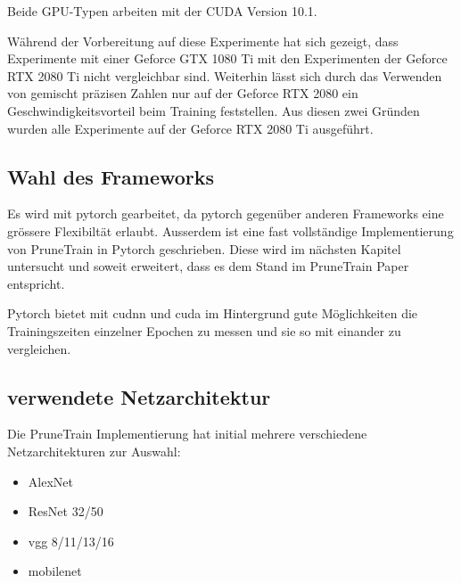 Beide GPU-Typen arbeiten mit der CUDA Version 10.1. 

Während der Vorbereitung auf diese Experimente hat sich gezeigt, dass Experimente mit einer Geforce GTX 1080 Ti mit den Experimenten der Geforce RTX 2080 Ti nicht vergleichbar sind. Weiterhin lässt sich durch das Verwenden von gemischt präzisen Zahlen nur auf der Geforce RTX 2080 ein Geschwindigkeitsvorteil beim Training feststellen. Aus diesen zwei Gründen wurden alle Experimente auf der Geforce RTX 2080 Ti ausgeführt.  


\subsection{Wahl des Frameworks}

Es wird mit pytorch gearbeitet, da pytorch gegenüber anderen Frameworks eine grössere Flexibiltät erlaubt. Ausserdem ist eine fast vollständige Implementierung von PruneTrain in Pytorch geschrieben. Diese wird im nächsten Kapitel untersucht und soweit erweitert, dass es dem Stand im PruneTrain Paper entspricht.

Pytorch bietet mit cudnn und cuda im Hintergrund gute Möglichkeiten die Trainingszeiten einzelner Epochen zu messen und sie so mit einander zu vergleichen.


\subsection{verwendete Netzarchitektur}\label{sec:archi}
Die PruneTrain Implementierung hat initial mehrere verschiedene Netzarchitekturen zur Auswahl:
\begin{itemize}
 \item AlexNet
 \item ResNet 32/50
 \item vgg 8/11/13/16
 \item mobilenet
\end{itemize}

